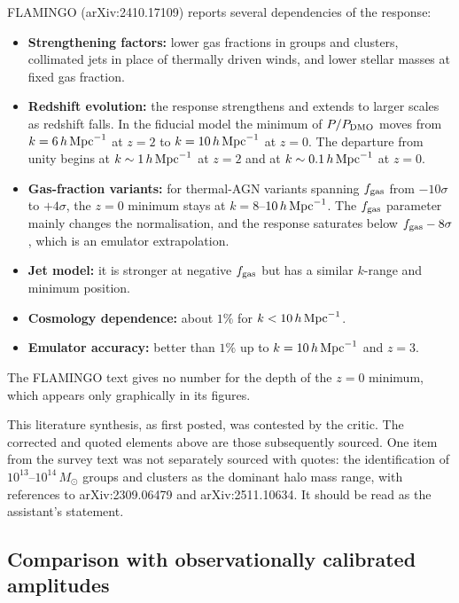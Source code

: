 \documentclass[11pt,a4paper]{article}
\begin{document}
FLAMINGO (arXiv:2410.17109) reports several dependencies of the response:
\begin{itemize}
\item \textbf{Strengthening factors:} lower gas fractions in groups and clusters, collimated jets in place of thermally driven winds, and lower stellar masses at fixed gas fraction.
\item \textbf{Redshift evolution:} the response strengthens and extends to larger scales as redshift falls. In the fiducial model the minimum of $P/P_{\rm DMO}$ moves from $k=6\,h\,{\rm Mpc}^{-1}$ at $z=2$ to $k=10\,h\,{\rm Mpc}^{-1}$ at $z=0$. The departure from unity begins at $k\sim1\,h\,{\rm Mpc}^{-1}$ at $z=2$ and at $k\sim0.1\,h\,{\rm Mpc}^{-1}$ at $z=0$.
\item \textbf{Gas-fraction variants:} for thermal-AGN variants spanning $f_{\rm gas}$ from $-10\sigma$ to $+4\sigma$, the $z=0$ minimum stays at $k=8$--$10\,h\,{\rm Mpc}^{-1}$. The $f_{\rm gas}$ parameter mainly changes the normalisation, and the response saturates below $f_{\rm gas}-8\sigma$, which is an emulator extrapolation.
\item \textbf{Jet model:} it is stronger at negative $f_{\rm gas}$ but has a similar $k$-range and minimum position.
\item \textbf{Cosmology dependence:} about $1\%$ for $k<10\,h\,{\rm Mpc}^{-1}$.
\item \textbf{Emulator accuracy:} better than $1\%$ up to $k=10\,h\,{\rm Mpc}^{-1}$ and $z=3$.
\end{itemize}
The FLAMINGO text gives no number for the depth of the $z=0$ minimum, which appears only graphically in its figures.

This literature synthesis, as first posted, was contested by the critic. The corrected and quoted elements above are those subsequently sourced. One item from the survey text was not separately sourced with quotes: the identification of $10^{13}$--$10^{14}\,M_\odot$ groups and clusters as the dominant halo mass range, with references to arXiv:2309.06479 and arXiv:2511.10634. It should be read as the assistant's statement.

\subsection{Comparison with observationally calibrated amplitudes}
\end{document}
